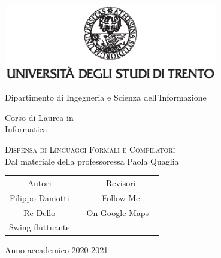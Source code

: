 \documentclass[class=book, crop=false, oneside]{standalone}
\begin{document}
\begin{titlepage}
	\centering
	\includegraphics[width=0.7\textwidth, keepaspectratio]{logo-unitn.eps}

	\vspace{1.4cm}
	\LARGE{Dipartimento di Ingegneria e Scienza dell'Informazione\\}

	\vspace{.9cm}
	\Large{Corso di Laurea in\\ Informatica}

	\vspace{1cm}
	\Huge\textsc{Dispensa di Linguaggi Formali e Compilatori\\}
	\large{Dal materiale della professoressa Paola Quaglia}

	\vspace{2cm}
	\begin{tabularx}{\textwidth}{cXc}
		\Large{Autori} & & \Large{Revisori}\\
		\cmidrule(lr){1-1} \cmidrule(lr){3-3}
		\large{Filippo Daniotti} & & \large{Follow Me}\\
		\large{Re Dello} & & \large{On Google Maps+}\\
		\large{Swing fluttuante} & & \\
	\end{tabularx}

	\vspace{1.2cm}
	\LARGE{Anno accademico 2020-2021}
\end{titlepage}
\end{document}
